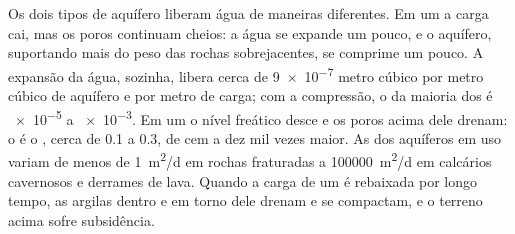 Os dois tipos de aquífero liberam água de maneiras diferentes. Em um 
a carga cai, mas os poros continuam cheios: a água se expande um
pouco, e o aquífero, suportando mais do peso das rochas sobrejacentes,
se comprime um pouco. A expansão da água, sozinha, libera cerca de
\num{9e-7} metro cúbico por metro cúbico de aquífero e por metro de carga;
com a compressão, o  da maioria dos  é
\num{e-5} a \num{e-3}. Em um  o nível freático desce e
os poros acima dele drenam: o  é o , cerca de 0.1
a 0.3, de cem a dez mil vezes maior. As  dos
aquíferos em uso variam de menos de \qty{1}{m^2/d} em rochas fraturadas
a \qty{100000}{m^2/d} em calcários cavernosos e derrames de lava. Quando a
carga de um  é rebaixada por longo tempo, as argilas dentro e
em torno dele drenam e se compactam, e o terreno acima sofre subsidência.

